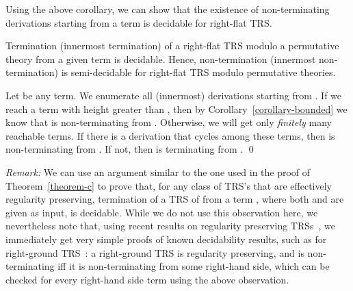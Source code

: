 \documentclass{LMCS}
\theoremstyle{plain}
\begin{document}
Using the above corollary, we can show that 
the existence of non-terminating derivations 
starting from a term is decidable for right-flat TRS. 
\begin{thm}\label{theorem-c}
Termination (innermost termination) of a right-flat TRS 
modulo a permutative theory  from
a given term is decidable. Hence, non-termination 
(innermost non-termination) is
semi-decidable for right-flat TRS modulo permutative theories.
\end{thm}
\proof
Let  be any term.
We enumerate all (innermost) derivations starting from .
If we reach a term with height greater than
,
then by Corollary~\ref{corollary-bounded} we know
that  is non-terminating from .
Otherwise, we will get only {\em finitely} many
reachable terms.  If there is a derivation that 
cycles among these terms, then  is non-terminating
from . If not, then  is terminating from .  \qed



\noindent
{\em Remark:}
We can use an argument similar to the one used in the proof of 
Theorem~\ref{theorem-c} to prove that,
for any class  of TRS's that are effectively
regularity preserving,
termination of a TRS  of 
from a term , where both  and  are given as input, 
is decidable.
While we do not use this observation here,
we nevertheless note that, using recent results on
regularity preserving TRSs~\cite{TakaiKajiSeki00:RTA},  
we immediately get very simple proofs of known decidability results, such as for
right-ground TRS~\cite{Dershowitz81:ICALP}: a right-ground
TRS is regularity preserving, and is non-terminating iff it is 
non-terminating from some right-hand side, which can
be checked for every right-hand side term using the above
observation.
\end{document}
